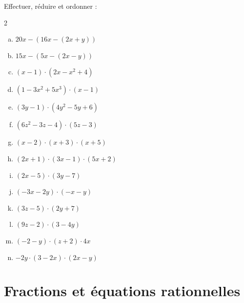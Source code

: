 \documentclass[twoside, a4paper, 12pt, openright, fullpage]{book}
\begin{document}
\begin{exercice}\label{littéral2}
Effectuer, réduire et ordonner :
\begin{multicols}{2}
\begin{enumerate}[a)]
    \item $20x-\left(16x-\left(2x+y\right)\right)$
    \item $15x-\left(5x-\left(2x-y\right)\right)$
    \item $(x-1)\cdot \left(2x-x^2+4\right)$
    \item $\left(1-3x^2+5x^3\right) \cdot (x-1)$
    \item $\left(3y-1\right)\cdot \left(4y^2-5y+6\right)$
    \item $\left(6z^2-3z-4\right) \cdot \left(5z-3\right)$
    \item $\left(x-2\right) \cdot \left(x+3\right) \cdot \left(x+5\right)$
    \item $\left(2x+1\right) \cdot \left(3x-1\right) \cdot \left(5x+2\right)$
    \item $\left( 2x-5\right) \cdot \left(3y-7\right)$
    \item $\left(-3x-2y\right)\cdot \left(-x-y\right)$
    \item $\left(3z-5\right)\cdot \left(2y+7\right)$
    \item $\left(9z-2\right) \cdot \left(3-4y\right)$
    \item $\left(-2-y\right) \cdot \left(z+2 \right) \cdot 4x$
    \item $-2y\cdot \left( 3-2x\right) \cdot \left( 2x-y\right)$
    \end{enumerate}
\end{multicols}
\end{exercice}

\section{Fractions et équations rationnelles}
\end{document}
